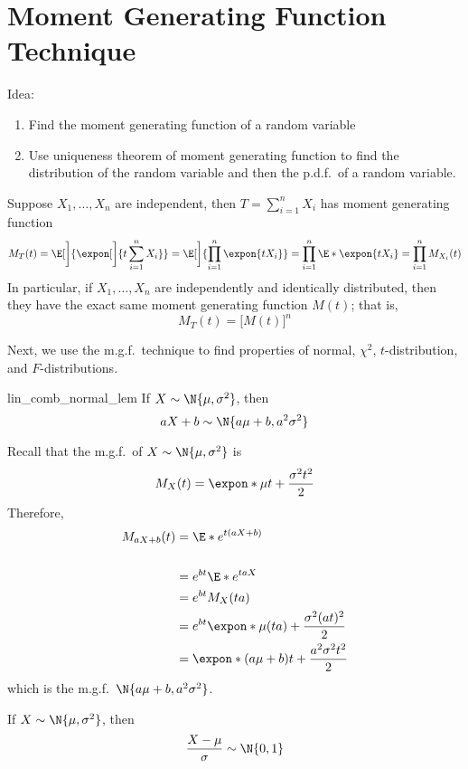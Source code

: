 \section{Moment Generating Function Technique}
Idea:
\begin{enumerate}[label=(\arabic*)]
    \item Find the moment generating function of a random variable
    \item Use uniqueness theorem of moment generating function
          to find the distribution of the random variable and then
          the p.d.f.\ of a random variable.
\end{enumerate}
\begin{Theorem}{}{}
    Suppose $ X_1,\ldots,X_n $
    are independent, then $ T=\sum_{i=1}^{n} X_i $
    has moment generating function
    \[ M_T(t)=\E[\bigg]{\expon[\bigg]{t \sum_{i=1}^{n} X_i}}=
        \E[\bigg]{\prod_{i=1}^n \expon{tX_i}}=\prod_{i=1}^n \E*{\expon{tX_i}}=
        \prod_{i=1}^n M_{X_i}(t) \]
    In particular, if $ X_1,\ldots,X_n $ are independently
    and identically distributed, then they
    have the exact same moment generating function $ M(t) $;
    that is,
    \[ M_T(t)=\bigl[ M(t) \bigr]^n \]
\end{Theorem}
Next, we use the m.g.f.\ technique to find properties
of normal, $ \chi^2 $, $ t $-distribution,
and $ F $-distributions.

\begin{Lemma}{}{lin_comb_normal_lem}
    If $ X \sim \N{\mu,\sigma^2} $, then
    \[ aX+b \sim \N{a\mu+b,a^2\sigma^2} \]
\end{Lemma}
\begin{Proof}{}{}
    Recall that the m.g.f.\ of $ X \sim \N{\mu,\sigma^2} $ is
    \[ M_X(t)
        =\expon*{\mu t+\frac{\sigma^2t^2}{2}} \]
    Therefore,
    \begin{align*}
        M_{aX+b}(t)
         & =\E*{e^{t(aX+b)}}                                 \\                                                            \\
         & =e^{b t}\E*{e^{taX}}                              \\
         & =e^{b t}M_X(ta)                                   \\
         & =e^{b t}\expon*{\mu(ta)+\frac{\sigma^2(at)^2}{2}} \\
         & =\expon*{(a\mu+b)t+\frac{a^2\sigma^2t^2}{2}}
    \end{align*}
    which is the m.g.f.\ $ \N{a\mu+b,a^2\sigma^2} $.
\end{Proof}
\begin{Theorem}{}{}
    If $ X \sim \N{\mu,\sigma^2} $, then
    \[ \frac{X-\mu}{\sigma} \sim \N{0,1} \]
\end{Theorem}

